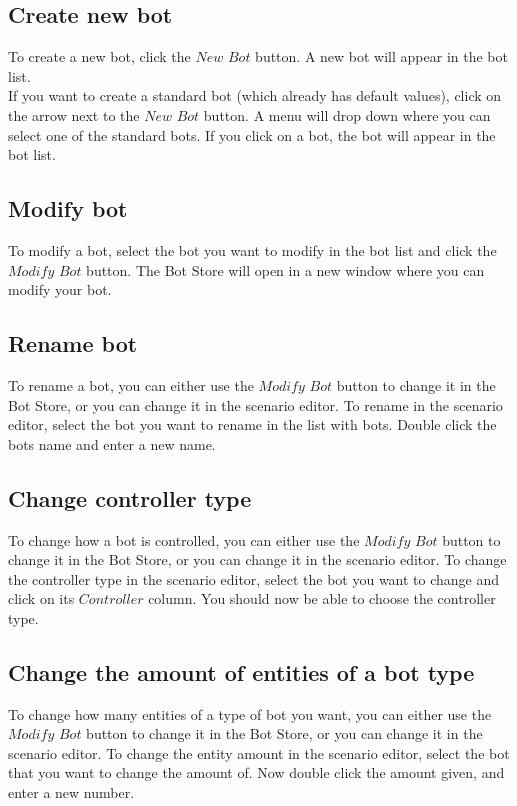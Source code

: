 \documentclass[a4paper]{article}
\begin{document}
\subsection{Create new bot}
To create a new bot, click the $New$ $Bot$ button. A new bot will appear in the bot list.\\
If you want to create a standard bot (which already has default values), click on the arrow next to the $New$ $Bot$ button. A menu will drop down where you can select one of the standard bots. If you click on a bot, the bot will appear in the bot list.

\subsection{Modify bot}
To modify a bot, select the bot you want to modify in the bot list and click the $Modify$ $Bot$ button. The Bot Store will open in a new window where you can modify your bot.

\subsection{Rename bot}
To rename a bot, you can either use the $Modify$ $Bot$ button to change it in the Bot Store, or you can change it in the scenario editor. To rename in the scenario editor, select the bot you want to rename in the list with bots. Double click the bots name and enter a new name. %

\subsection{Change controller type}
To change how a bot is controlled, you can either use the $Modify$ $Bot$ button to change it in the Bot Store, or you can change it in the scenario editor. To change the controller type in the scenario editor, select the bot you want to change and click on its $Controller$ column. You should now be able to choose the controller type.

\subsection{Change the amount of entities of a bot type}
To change how many entities of a type of bot you want, you can either use the $Modify$ $Bot$ button to change it in the Bot Store, or you can change it in the scenario editor. To change the entity amount in the scenario editor, select the bot that you want to change the amount of. Now double click the amount given, and enter a new number.
\end{document}

